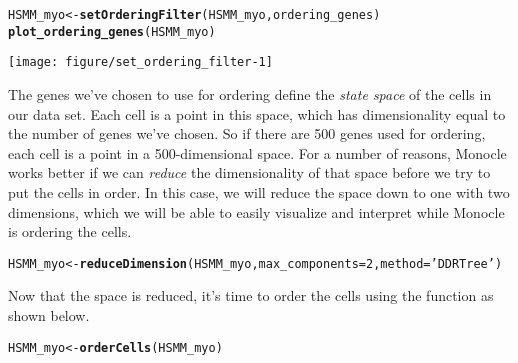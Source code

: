 \documentclass[10pt,oneside]{article}\usepackage[]{graphicx}\usepackage[]{color}
\makeatletter
\def\maxwidth{ %
  \ifdim\Gin@nat@width>\linewidth
    \linewidth
  \else
    \Gin@nat@width
  \fi
}
\newcommand{\hlnum}[1]{\textcolor[rgb]{0.686,0.059,0.569}{#1}}%
\newcommand{\hlstr}[1]{\textcolor[rgb]{0.192,0.494,0.8}{#1}}%
\newcommand{\hlstd}[1]{\textcolor[rgb]{0.345,0.345,0.345}{#1}}%
\newcommand{\hlkwb}[1]{\textcolor[rgb]{0.69,0.353,0.396}{#1}}%
\newcommand{\hlkwc}[1]{\textcolor[rgb]{0.333,0.667,0.333}{#1}}%
\newcommand{\hlkwd}[1]{\textcolor[rgb]{0.737,0.353,0.396}{\textbf{#1}}}%
\newenvironment{kframe}{%
 \def\at@end@of@kframe{}%
 \ifinner\ifhmode%
  \def\at@end@of@kframe{\end{minipage}}%
  \begin{minipage}{\columnwidth}%
 \fi\fi%
 \def\FrameCommand##1{\hskip\@totalleftmargin \hskip-\fboxsep
 \colorbox{shadecolor}{##1}\hskip-\fboxsep
     \hskip-\linewidth \hskip-\@totalleftmargin \hskip\columnwidth}%
 \MakeFramed {\advance\hsize-\width
   \@totalleftmargin\z@ \linewidth\hsize
   \@setminipage}}%
 {\par\unskip\endMakeFramed%
 \at@end@of@kframe}
\newenvironment{knitrout}{}{} %
\makeatother
\begin{document}
\begin{knitrout}
\color{fgcolor}\begin{kframe}
\begin{alltt}
\hlstd{HSMM_myo} \hlkwb{<-} \hlkwd{setOrderingFilter}\hlstd{(HSMM_myo, ordering_genes)}
\hlkwd{plot_ordering_genes}\hlstd{(HSMM_myo)}
\end{alltt}
\end{kframe}

{\centering \texttt{[image: figure/set\_ordering\_filter-1]} 

}



\end{knitrout}
 
The genes we've chosen to use for ordering define the \emph{state space} of the cells in our data set.  Each cell is a point in this space, which has dimensionality equal to the number of genes we've chosen.  So if there are 500 genes used for ordering, each cell is a point in a 500-dimensional space.  For a number of reasons, Monocle works better if we can \emph{reduce} the dimensionality of that space before we try to put the cells in order.  In this case, we will reduce the space down to one with two dimensions, which we will be able to easily visualize and interpret while Monocle is ordering the cells.
\begin{knitrout}
\color{fgcolor}\begin{kframe}
\begin{alltt}
\hlstd{HSMM_myo} \hlkwb{<-} \hlkwd{reduceDimension}\hlstd{(HSMM_myo,} \hlkwc{max_components}\hlstd{=}\hlnum{2}\hlstd{,} \hlkwc{method} \hlstd{=} \hlstr{'DDRTree'}\hlstd{)}
\end{alltt}
\end{kframe}
\end{knitrout}
 
Now that the space is reduced, it's time to order the cells using the  function as shown below. 

\begin{knitrout}
\color{fgcolor}\begin{kframe}
\begin{alltt}
\hlstd{HSMM_myo} \hlkwb{<-} \hlkwd{orderCells}\hlstd{(HSMM_myo)}
\end{alltt}
\end{kframe}
\end{knitrout}
\end{document}
